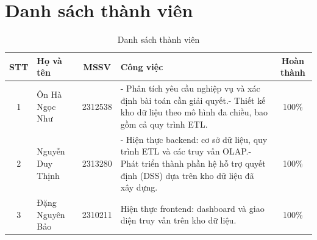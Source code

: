 \section*{Danh sách thành viên}
\begin{table}[h]
\caption{\label{table1}Danh sách thành viên}
\renewcommand{\arraystretch}{1.5}
\begin{tabularx}{\textwidth}{|c|l|c|>{\raggedright\arraybackslash}X|c|}
\hline
\textbf{STT} & \textbf{Họ và tên} & \textbf{MSSV} & \textbf{Công việc} & \textbf{Hoàn thành} \\
\hline 
1 & Ôn Hà Ngọc Như & 2312538 & - Phân tích yêu cầu nghiệp vụ và xác định bài toán cần giải quyết.\newline - Thiết kế kho dữ liệu theo mô hình đa chiều, bao gồm cả quy trình ETL. & 100\% \\
\hline
2 & Nguyễn Duy Thịnh & 2313280 & - Hiện thực backend: cơ sở dữ liệu, quy trình ETL và các truy vấn OLAP.\newline - Phát triển thành phần hệ hỗ trợ quyết định (DSS) dựa trên kho dữ liệu đã xây dựng. & 100\% \\
\hline
3 & Đặng Nguyên Bảo & 2310211 & Hiện thực frontend: dashboard và giao diện truy vấn trên kho dữ liệu. & 100\% \\
\hline
\end{tabularx}
\end{table}